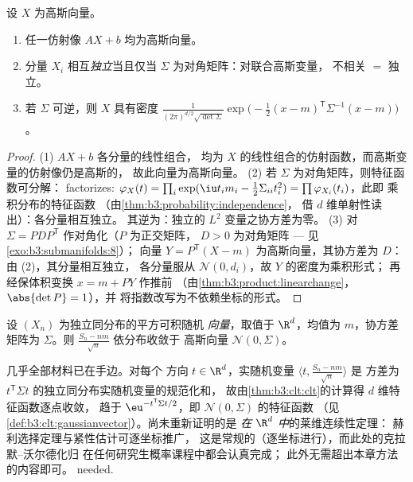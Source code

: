 \begin{theorem}\label{thm:b3:clt:gaussianvector}
设 $X$ 为高斯向量。
\begin{enumerate}
  \item 任一仿射像 $AX + b$ 均为高斯向量。
  \item 分量 $X_i$ 相互\emph{独立}当且仅当
        $\Sigma$ 为对角矩阵：对联合高斯变量，
        不相关 $=$ 独立。
  \item 若 $\Sigma$ 可逆，则 $X$ 具有密度
        $\frac{1}{(2\pi)^{d/2}\sqrt{\det\Sigma}}
        \exp\bigl(-\frac12(x - m)^{\mathsf T}\Sigma^{-1}(x -
        m)\bigr)$。
\end{enumerate}
\end{theorem}

\begin{proof}
(1) $AX + b$ 各分量的线性组合，
均为 $X$ 的线性组合的仿射函数，而高斯变量的仿射像仍是高斯的，
故此向量为高斯向量。
(2) 若 $\Sigma$ 为对角矩阵，则特征函数可分解：
factorizes: $\varphi_X(t) = \prod_i\exp(\iu t_im_i -
\frac12\Sigma_{ii}t_i^2) = \prod\varphi_{X_i}(t_i)$，此即
乘积分布的特征函数
（由\cref{thm:b3:probability:independence}，
借 $d$ 维单射性读出）：各分量相互独立。
其逆为：独立的
$L^2$ 变量之协方差为零。
(3) 对 $\Sigma = P D P^{\mathsf T}$ 作对角化（$P$ 为正交矩阵，
$D > 0$ 为对角矩阵 --- 见\cref{exo:b3:submanifolds:8}）；
向量 $Y = P^{\mathsf T}(X - m)$ 为高斯向量，其协方差为
$D$：由 (2)，其分量相互独立，
各分量服从 $\mathcal N(0, d_i)$，故 $Y$ 的密度为乘积形式；
再经保体积变换 $x = m + PY$ 作推前
（由\cref{thm:b3:product:linearchange}，$\abs{\det P} = 1$），并
将指数改写为不依赖坐标的形式。
\end{proof}

\begin{theorem}[多维中心极限定理]
\label{thm:b3:clt:multiclt}
设 $(X_n)$ 为独立同分布的平方可积随机
\emph{向量}，取值于 $\R^d$，均值为 $m$，协方差矩阵为
$\Sigma$。则 $\frac{S_n - nm}{\sqrt n}$ 依分布收敛于
高斯向量 $\mathcal N(0,
\Sigma)$。
\admitted
\end{theorem}

\begin{remark}\label{rem:b3:clt:multiclt}
几乎全部材料已在手边。对每个
方向 $t \in \R^d$，实随机变量 $\langle t,
\frac{S_n - nm}{\sqrt n}\rangle$ 是
方差为 $t^{\mathsf T}\Sigma t$ 的独立同分布实随机变量的规范化和，
故由\cref{thm:b3:clt:clt}的计算得
$d$ 维特征函数逐点收敛，
趋于 $\eu^{-t^{\mathsf T}\Sigma t/2}$，即
$\mathcal N(0, \Sigma)$ 的特征函数
（见\cref{def:b3:clt:gaussianvector}）。尚未重新证明的是
\emph{在 $\R^d$ 中}的莱维连续性定理：
赫利选择定理与紧性估计可逐坐标推广，
这是常规的（逐坐标进行），而此处的克拉默–沃尔德化归
在任何研究生概率课程中都会认真完成；
此外无需超出本章方法的内容即可。
needed.
\end{remark}

